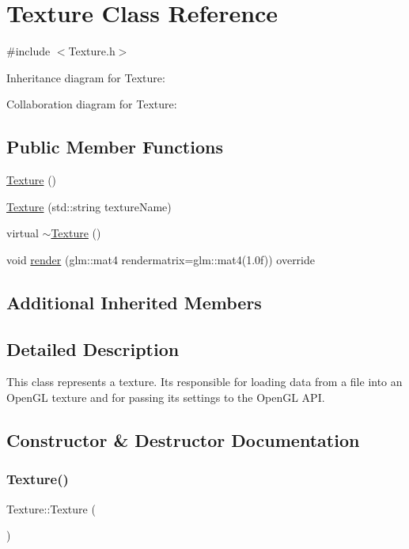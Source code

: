 \hypertarget{classTexture}{}\section{Texture Class Reference}
\label{classTexture}


{\ttfamily \#include $<$Texture.\+h$>$}



Inheritance diagram for Texture\+:


Collaboration diagram for Texture\+:
\subsection*{Public Member Functions}
\begin{DoxyCompactItemize}
\item 
\hyperlink{classTexture_a6c275e3f186675ff6ed73ccf970e552f}{Texture} ()
\item 
\hyperlink{classTexture_ae9b5167a274031b947316833d6fd4886}{Texture} (std\+::string texture\+Name)
\item 
virtual \hyperlink{classTexture_a09c4bcb7462f64c1d20fa69dba3cee8a}{$\sim$\+Texture} ()
\item 
void \hyperlink{classTexture_a2771beaa1d538acddacc48d53bc75bdf}{render} (glm\+::mat4 rendermatrix=glm\+::mat4(1.\+0f)) override
\end{DoxyCompactItemize}
\subsection*{Additional Inherited Members}


\subsection{Detailed Description}
This class represents a texture. It\textquotesingle{}s responsible for loading data from a file into an Open\+GL texture and for passing its settings to the Open\+GL A\+PI. 

\subsection{Constructor \& Destructor Documentation}
\mbox{\label{classTexture_a6c275e3f186675ff6ed73ccf970e552f}} 
\subsubsection{\texorpdfstring{Texture()}{Texture()}\hspace{0.1cm}{\footnotesize\ttfamily [1/2]}}
{\footnotesize\ttfamily Texture\+::\+Texture (\begin{DoxyParamCaption}{ }\end{DoxyParamCaption})}

